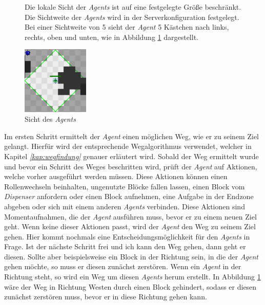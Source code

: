 \begin{figure}
	\begin{minipage}{0.6\textwidth}
		Die lokale Sicht der \textit{Agents} ist auf eine festgelegte Größe beschränkt. Die Sichtweite der \textit{Agents} wird in der Serverkonfiguration festgelegt. Bei einer Sichtweite von 5 sieht der \textit{Agent} 5 Kästchen nach links, rechts, oben und unten, wie in Abbildung \ref{fig:agentensicht} dargestellt.
	\end{minipage}
	\begin{minipage}{0.4\textwidth}
		\centering
		\includegraphics[width=120px]{bilder/agentensicht}
		\caption{Sicht des \textit{Agents}}
		\label{fig:agentensicht}
	\end{minipage}
\end{figure}

Im ersten Schritt ermittelt der \textit{Agent} einen möglichen Weg, wie er zu seinem Ziel gelangt. Hierfür wird der entsprechende Wegalgorithmus verwendet, welcher in Kapitel \textit{\ref{kap:wegfindung}} genauer erläutert wird. Sobald der Weg ermittelt wurde und bevor ein Schritt des Weges beschritten wird, prüft der \textit{Agent} auf Aktionen, welche vorher ausgeführt werden müssen. Diese Aktionen können einen Rollenwechseln beinhalten, ungenutzte Blöcke fallen lassen, einen Block vom \textit{Dispenser} anfordern oder einen Block aufnehmen, eine Aufgabe in der Endzone abgeben oder sich mit einem anderen \textit{Agents} verbinden. Diese Aktionen sind Momentaufnahmen, die der \textit{Agent} ausführen muss, bevor er zu einem neuen Ziel geht. Wenn keine dieser Aktionen passt, wird der \textit{Agent} den Weg zu seinem Ziel gehen. Hier kommt nochmals eine Entscheidungsmöglichkeit für den \textit{Agents} in Frage. Ist der nächste Schritt frei und ich kann den Weg gehen, dann geht er diesen. Sollte aber beispielsweise ein Block in der Richtung sein, in die der \textit{Agent} gehen möchte, so muss er diesen zunächst zerstören. Wenn ein \textit{Agent} in der Richtung steht, so wird ein Weg um diesen \textit{Agents} herum erstellt. In Abbildung \ref{fig:agentensicht} wäre der Weg in Richtung Westen durch einen Block gehindert, sodass er diesen zunächst zerstören muss, bevor er in diese Richtung gehen kann. 

